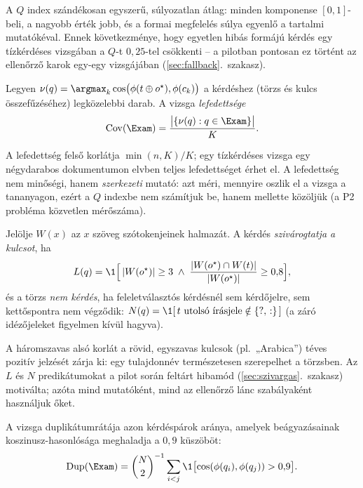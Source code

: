 A $Q$ index szándékosan egyszerű, súlyozatlan átlag: minden komponense $[0,1]$-beli, a nagyobb érték
jobb, és a formai megfelelés súlya egyenlő a tartalmi mutatókéval. Ennek következménye, hogy egyetlen
hibás formájú kérdés egy tízkérdéses vizsgában a $Q$-t $0{,}25$-tel csökkenti -- a pilotban pontosan ez
történt az ellenőrző karok egy-egy vizsgájában (\ref{sec:fallback}.~szakasz).

\begin{definicio}[Lefedettség]
Legyen $\nu(q)=\argmax_{k}\cos\bigl(\phi(t\oplus o^{\star}),\phi(c_k)\bigr)$ a kérdéshez (törzs és kulcs
összefűzéséhez) legközelebbi darab. A vizsga \emph{lefedettsége}
\begin{equation}
\mathrm{Cov}(\Exam)=\frac{\bigl|\{\nu(q):q\in\Exam\}\bigr|}{K}.
\label{eq:cov}
\end{equation}
\end{definicio}

A lefedettség felső korlátja $\min(n,K)/K$; egy tízkérdéses vizsga egy négydarabos dokumentumon elvben
teljes lefedettséget érhet el. A lefedettség nem minőségi, hanem \emph{szerkezeti} mutató: azt méri,
mennyire oszlik el a vizsga a tananyagon, ezért a $Q$ indexbe nem számítjuk be, hanem mellette
közöljük (a P2 probléma közvetlen mérőszáma).

\begin{definicio}
Jelölje $W(x)$ az $x$ szöveg szótokenjeinek halmazát. A kérdés \emph{szivárogtatja a kulcsot}, ha
\begin{equation}
L(q)=\1\Bigl[\,|W(o^{\star})|\ge 3\;\wedge\;\frac{|W(o^{\star})\cap W(t)|}{|W(o^{\star})|}\ge 0{,}8\Bigr],
\label{eq:leak}
\end{equation}
és a törzs \emph{nem kérdés}, ha feleletválasztós kérdésnél sem kérdőjelre, sem kettőspontra nem végződik:
$N(q)=\1[\,t \text{ utolsó írásjele}\notin\{\text{?},\,\text{:}\}\,]$ (a záró idézőjeleket figyelmen kívül hagyva).
\end{definicio}

A háromszavas alsó korlát a rövid, egyszavas kulcsok (pl.\ „Arabica”) téves pozitív jelzését zárja ki:
egy tulajdonnév természetesen szerepelhet a törzsben. Az $L$ és $N$ predikátumokat a pilot során feltárt
hibamód (\ref{sec:szivargas}.~szakasz) motiválta; azóta mind mutatóként, mind az ellenőrző lánc
szabályaként használjuk őket.

\begin{definicio}[Duplikátumráta]
A vizsga duplikátumrátája azon kérdéspárok aránya, amelyek beágyazásainak koszinusz-hasonlósága
meghaladja a $0{,}9$ küszöböt:
\begin{equation*}
\mathrm{Dup}(\Exam)=\binom{N}{2}^{-1}\sum_{i<j}\1\bigl[\cos(\phi(q_i),\phi(q_j))>0{,}9\bigr].
\end{equation*}
\end{definicio}

